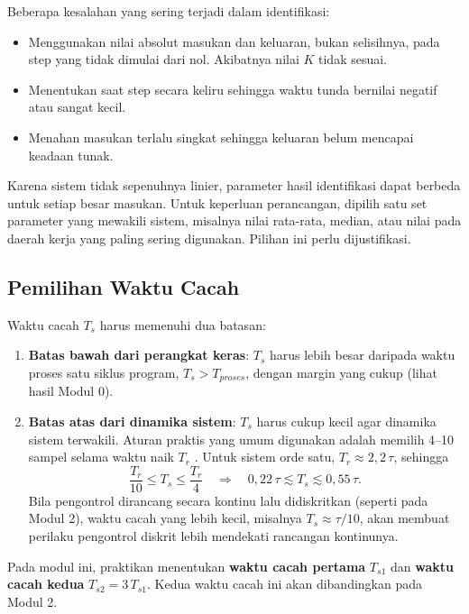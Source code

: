 \documentclass[11pt,a4paper]{article}
\begin{document}
Beberapa kesalahan yang sering terjadi dalam identifikasi:
\begin{itemize}
	\item Menggunakan nilai absolut masukan dan keluaran, bukan selisihnya, pada step yang tidak dimulai dari nol. Akibatnya nilai $K$ tidak sesuai.
	\item Menentukan saat step secara keliru sehingga waktu tunda bernilai negatif atau sangat kecil.
	\item Menahan masukan terlalu singkat sehingga keluaran belum mencapai keadaan tunak.
\end{itemize}

Karena sistem tidak sepenuhnya linier, parameter hasil identifikasi dapat berbeda untuk setiap besar masukan. Untuk keperluan perancangan, dipilih satu set parameter yang mewakili sistem, misalnya nilai rata-rata, median, atau nilai pada daerah kerja yang paling sering digunakan. Pilihan ini perlu dijustifikasi.

\subsection{Pemilihan Waktu Cacah}
Waktu cacah $T_s$ harus memenuhi dua batasan:
\begin{enumerate}
	\item \textbf{Batas bawah dari perangkat keras}: $T_s$ harus lebih besar daripada waktu proses satu siklus program, $T_s > T_{proses}$, dengan margin yang cukup (lihat hasil Modul 0).
	\item \textbf{Batas atas dari dinamika sistem}: $T_s$ harus cukup kecil agar dinamika sistem terwakili. Aturan praktis yang umum digunakan adalah memilih 4--10 sampel selama waktu naik $T_r$ \cite{astrom}. Untuk sistem orde satu, $T_r \approx 2{,}2\,\tau$, sehingga
	      \begin{equation}
		      \frac{T_r}{10} \le T_s \le \frac{T_r}{4}
		      \quad\Longrightarrow\quad
		      0{,}22\,\tau \lesssim T_s \lesssim 0{,}55\,\tau.
		      \label{eq:ts_rule}
	      \end{equation}
	      Bila pengontrol dirancang secara kontinu lalu didiskritkan (seperti pada Modul 2), waktu cacah yang lebih kecil, misalnya $T_s \approx \tau/10$, akan membuat perilaku pengontrol diskrit lebih mendekati rancangan kontinunya.
\end{enumerate}
Pada modul ini, praktikan menentukan \textbf{waktu cacah pertama} $T_{s1}$ dan \textbf{waktu cacah kedua} $T_{s2} = 3\,T_{s1}$. Kedua waktu cacah ini akan dibandingkan pada Modul 2.
\end{document}
